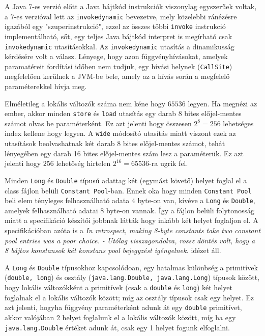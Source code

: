 \begin{compactitem}
 \item A Java 7-es verzió előtt a Java bájtkód instrukciók viszonylag egyszerűek voltak, a 7-es verzióval lett az \lstinline{invokedynamic} bevezetve, mely közelebbi ránézésre igazából egy "szuperinstrukció", ezzel az összes többi \lstinline{invoke} instrukció implementálható, sőt, egy teljes Java bájtkód interpret is megírható csak \lstinline{invokedynamic} utasításokkal. Az \lstinline{invokedynamic} utasítás a dinamikusság kérdésére volt a válasz. Lényege, hogy azon függvényhívásokat, amelyek paramatéreit fordítási időben nem tudjuk, egy hívási helynek (\lstinline{CallSite}) megfelelően kerülnek a JVM-be bele, amely az a hívás során a megfelelő paraméterekkel hívja meg.
 \item Elméletileg a lokális változók száma nem kéne hogy $65536$ legyen. Ha megnézi az ember, akkor minden \lstinline{store} és \lstinline{load} utasítás egy darab 8 bites előjel-mentes számot olvas be paraméterként. Ez azt jelenti hogy összesen $2^{8} = 256$ lehetséges index kellene hogy legyen. A \lstinline{wide} módosító utasítás miatt viszont ezek az utasítások beolvashatnak két darab 8 bites előjel-mentes számot, tehát lényegében egy darab 16 bites előjel-mentes szám lesz a paraméterük. Ez azt jelenti hogy $256$ lehetőség hirtelen $2^{16} = 65536$-ra ugrik fel.
 \item Minden \lstinline{Long} és \lstinline{Double} típusú adattag két (egymást követő) helyet foglal el a class fájlon belüli \lstinline{Constant Pool}-ban. Ennek oka hogy minden \lstinline{Constant Pool} beli elem tényleges felhasználható adata $4$ byte-on van, kívéve a \lstinline{Long} és \lstinline{Double}, amelyek felhasználható adatai $8$ byte-on vannak. Így a fájlon belüli folytonosság miatt a specifikáció készítői jobbnak látták hogy inkább két helyet foglaljon el. A specifikációban azóta is a \textit{In retrospect, making 8-byte constants take two constant pool entries was a poor choice. - Utólag visszagondolva, rossz döntés volt, hogy a 8 bájtos konstansok két konstans pool bejegyzést igényelnek.} idézet áll.
 \item A \lstinline{Long} és \lstinline{Double} típusokhoz kapcsolódoan, egy hatalmas különbség a primitívek (\lstinline{double, long}) és osztály (\lstinline{java.lang.Double, java.lang.Long}) típusok között, hogy lokális változókként a primitívek (csak a \lstinline{double} és \lstinline{long}) két helyet foglalnak el a lokális változók között; míg az osztály típusok csak egy helyet. Ez azt jelenti, hogyha függvény paraméterként adunk át egy \lstinline{double} primitívet, akkor valójában 2 helyet foglalunk el a lokális változók között, míg ha egy \lstinline{java.lang.Double} értéket adunk át, csak egy 1 helyet fogunk elfoglalni.
\end{compactitem}

